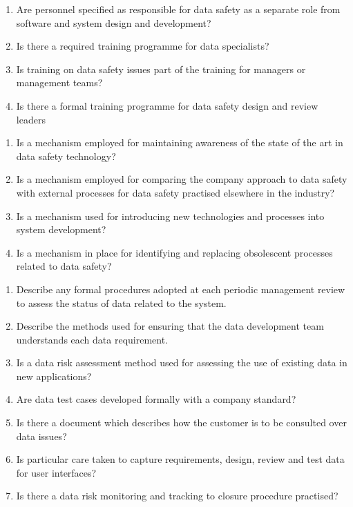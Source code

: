 \begin{enumerate}
  \item Are personnel specified as responsible for data safety as a separate role from software and system design and development?
  \item Is there a required training programme for data specialists?
  \item Is training on data safety issues part of the training for managers or management teams?
  \item Is there a formal training programme for data safety design and review leaders
\end{enumerate}

\begin{enumerate}
  \item Is a mechanism employed for maintaining awareness of the state of the art in data safety technology?
  \item Is a mechanism employed for comparing the company approach to data safety with external processes for data safety practised elsewhere in the industry?
  \item Is a mechanism used for introducing new technologies and processes into system development?
  \item Is a mechanism in place for identifying and replacing obsolescent processes related to data safety?
\end{enumerate}

\clearpage%
\begin{enumerate}
  \item Describe any formal procedures adopted at each periodic management review to assess the status of data related to the system.
  \item Describe the methods used for ensuring that the data development team understands each data requirement.
  \item Is a data risk assessment method used for assessing the use of existing data in new applications?
  \item Are data test cases developed formally with a company standard?
  \item Is there a document which describes how the customer is to be consulted over data issues?
  \item Is particular care taken to capture requirements, design, review and test data for user interfaces?
  \item Is there a data risk monitoring and tracking to closure procedure practised?
\end{enumerate}

